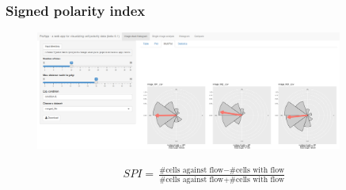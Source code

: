 \documentclass[14pt]{beamer}
\begin{document}
\begin{frame}
\frametitle{\normalsize \bf Signed polarity index}
\scriptsize
\centering

\begin{figure}
  \centering
  \includegraphics[width=0.9\textwidth]{images/app_variation.png}\\
\end{figure}

\begin{align}
    SPI = \frac{\text{\#cells against flow} - \text{\#cells with flow}}{\text{\#cells against flow} + \text{\#cells with flow}}
\end{align}



\end{frame}




\end{document}

